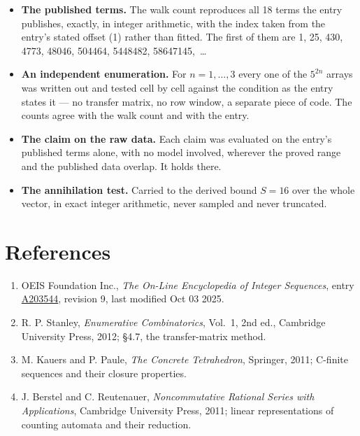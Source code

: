 \documentclass[11pt]{article}
\theoremstyle{definition}
\begin{document}
\begin{itemize}

\item {\bfseries The published terms.} The walk count reproduces all 18 terms the entry publishes, exactly, in integer arithmetic, with the index taken from the entry's stated offset (1) rather than fitted. The first of them are 1, 25, 430, 4773, 48046, 504464, 5448482, 58647145,~\dots

\item {\bfseries An independent enumeration.} For $n = 1,\dots,3$ every one of the $5^{2n}$ arrays was written out and tested cell by cell against the condition as the entry states it --- no transfer matrix, no row window, a separate piece of code. The counts agree with the walk count and with the entry.

\item {\bfseries The claim on the raw data.} Each claim was evaluated on the entry's published terms alone, with no model involved, wherever the proved range and the published data overlap. It holds there.

\item {\bfseries The annihilation test.} Carried to the derived bound $S = 16$ over the whole vector, in exact integer arithmetic, never sampled and never truncated.

\end{itemize}

\section{References}

\begin{enumerate}

\item OEIS Foundation Inc., \emph{The On-Line Encyclopedia of Integer Sequences}, entry \href{https://oeis.org/A203544}{A203544}, revision 9, last modified Oct 03 2025.

\item R. P. Stanley, \emph{Enumerative Combinatorics}, Vol.~1, 2nd ed., Cambridge University Press, 2012; \S4.7, the transfer-matrix method.

\item M. Kauers and P. Paule, \emph{The Concrete Tetrahedron}, Springer, 2011; C-finite sequences and their closure properties.

\item J. Berstel and C. Reutenauer, \emph{Noncommutative Rational Series with Applications}, Cambridge University Press, 2011; linear representations of counting automata and their reduction.

\end{enumerate}
\end{document}
